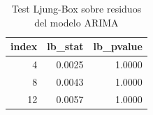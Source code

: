 \begin{table}
\caption{Test Ljung-Box sobre residuos del modelo ARIMA}
\label{tab:ljung_box}
\begin{tabular}{rrr}
\toprule
index & lb_stat & lb_pvalue \\
\midrule
4 & 0.0025 & 1.0000 \\
8 & 0.0043 & 1.0000 \\
12 & 0.0057 & 1.0000 \\
\bottomrule
\end{tabular}
\end{table}

